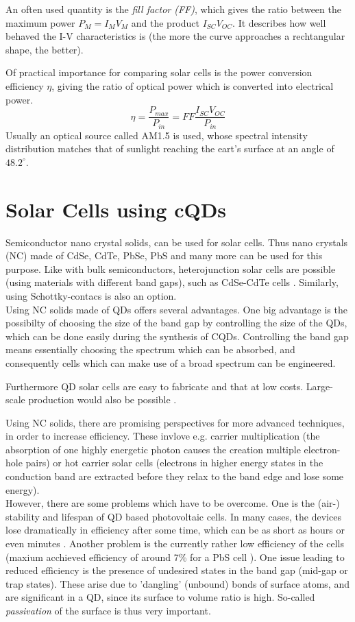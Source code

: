 An often used quantity is the \textit{fill factor (FF)}, which gives the ratio between the maximum power $P_M=I_M V_M$ and the product $I_{SC} V_{OC}$. It describes how well behaved the I-V characteristics is (the more the curve approaches a rechtangular shape, the better).

Of practical importance for comparing solar cells is the power conversion efficiency $\eta$, giving the ratio of optical power which is converted into electrical power. 
\[\eta = \frac{P_{max}}{P_{in}} = FF\frac{I_{SC}V_{OC}}{P_{in}}\]
Usually an optical source called AM1.5 is used, whose spectral intensity distribution matches that of sunlight reaching the eart's surface at an angle of $48.2^{\circ}$. \cite{ChemRev}

\section{Solar Cells using cQDs}

Semiconductor nano crystal solids, can be used for solar cells. Thus nano crystals (NC) made of CdSe, CdTe, PbSe, PbS and many more can be used for this purpose. Like with bulk semiconductors, heterojunction solar cells are possible (using materials with different band gaps), such as CdSe-CdTe cells \cite{ChemRev}. Similarly, using Schottky-contacs is also an option.\\

Using NC solids made of QDs offers several advantages. One big advantage is the possibilty of choosing the size of the band gap by controlling the size of the QDs, which can be done easily during the synthesis of CQDs. Controlling the band gap means essentially choosing the spectrum which can be absorbed, and consequently cells which can make use of a broad spectrum can be engineered.

Furthermore QD solar cells are easy to fabricate and that at low costs. Large-scale production would also be possible \cite{ChemRev}.

Using NC solids, there are promising perspectives for more advanced techniques, in order to increase efficiency. These invlove e.g. carrier multiplication (the absorption of one highly energetic photon causes the creation multiple electron-hole pairs) or hot carrier solar cells (electrons in higher energy states in the conduction band are extracted before they relax to the band edge and lose some energy).\\

However, there are some problems which have to be overcome. One is the (air-) stability and lifespan of QD based photovoltaic cells. In many cases, the devices lose dramatically in efficiency after some time, which can be as short as hours or even minutes \cite{Tang2011}. Another problem is the currently rather low efficiency of the cells (maxium acchieved efficiency of around 7\% for a PbS cell \cite{Ip2012}). One issue leading to reduced efficiency is the presence of undesired states in the band gap (mid-gap or trap states). These arise due to 'dangling' (unbound) bonds of surface atoms, and are significant in a QD, since its surface to volume ratio is high. So-called \textit{passivation} of the surface is thus very important. 

